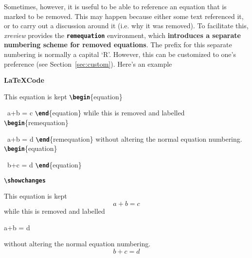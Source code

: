\documentclass[a4paper]{ltxdoc}
\newcommand{\writecommand}[1]{\texttt{\textbf{{\textbackslash#1}}}}
\newcommand{\writeenv}[1]{\texttt{\textbf{{#1}}}}
\newcommand{\writearg}[1]{\{#1\}}
\begin{document}
Sometimes, however, it is useful to be able to reference an equation that is marked to be removed. This may happen because either some text referenced it, or to carry out a discussion around it (i.e. why it was removed).
To facilitate this, \textit{xreview} provides the \writeenv{remequation} environment, which \textbf{introduces a separate numbering scheme for removed equations}. 
The prefix for this separate numbering is normally a capital `R'. However, this can be customized to one's preference (see Section~\ref{sec:custom}).
Here's an example

\begin{center}
    \begin{minipage}[t]{0.3\linewidth}
    \textbf{\LaTeX Code}
    
    This equation is kept \newline
    \writecommand{begin}\writearg{equation}

    ~\quad a+b = c\newline
    \writecommand{end}\writearg{equation}\newline
    while this is removed and labelled\newline
    \writecommand{begin}\writearg{remequation}

    ~\quad a+b = d\newline
    \writecommand{end}\writearg{remequation}\newline
    without altering the normal equation numbering.\newline
    \writecommand{begin}\writearg{equation}

    ~\quad b+c = d\newline
    \writecommand{end}\writearg{equation}\newline

    \end{minipage}
    \hfill
    \begin{minipage}[t]{0.3\linewidth}
    \writecommand{showchanges}
    \showchanges
    
    This equation is kept
    \begin{equation}
        a+b = c
    \end{equation}
    while this is removed and labelled
    \begin{remequation}
        a+b = d
        \label{eq:remeq_example}
    \end{remequation}\addtocounter{removedeqcounter}{-1}
    without altering the normal equation numbering.
    \begin{equation}
        b+c = d
    \end{equation}\addtocounter{equation}{-2}


\end{minipage}
\end{center}
\end{document}
